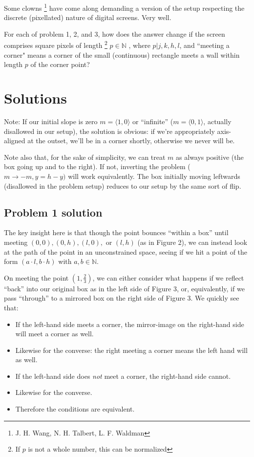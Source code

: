 \documentclass[11pt, oneside]{article} 	%
\begin{document}
Some clowns \footnote {J. H. Wang, N. H. Talbert, L. F. Waldman} have come along demanding a version of the setup respecting the discrete (pixellated) nature of digital screens.  Very well.

For each of problem 1, 2, and 3, how does the answer change if the screen comprises square pixels of length \footnote{If $p$ is not a whole number, this can be normalized} $p \in \mathbb{N}$ , where $p | j, k, h, l$, and ``meeting a corner" means a corner of the small (continuous) rectangle meets a wall within length $p$ of the corner point?



\section{Solutions}

Note: If our initial slope is zero $m = \langle 1, 0 \rangle$ or ``infinite'' ($m = \langle 0, 1 \rangle$, actually disallowed in our setup), the solution is obvious: if we're appropriately axis-aligned at the outset, we'll be in a corner shortly, otherwise we never will be.

Note also that, for the sake of simplicity, we can treat $m$ as always positive (the box going up and to the right). If not, inverting the problem ($m \rightarrow -m, y = h - y)$ will work equivalently. The box initially moving leftwards (disallowed in the problem setup) reduces to our setup by the same sort of flip.

\subsection{Problem 1 solution}

The key insight here is that though the point bounces ``within a box'' until meeting $(0,0), (0, h), (l, 0), $ or $(l, h)$ (as in Figure 2), we can instead look at the path of the point in an unconstrained space, seeing if we hit a point of the form $(a \cdot l, b \cdot h)$ with $a,b \in \mathbb{N}$.

On meeting the point $(1, \frac{2}{3})$, we can either consider what happens if we reflect ``back'' into our original box as in the left side of Figure 3, or, equivalently, if we pass ``through'' to a mirrored box on the right side of Figure 3. We quickly see that:

\begin{itemize} 
\item If the left-hand side meets a corner, the mirror-image on the right-hand side will meet a corner as well.
\item Likewise for the converse: the right meeting a corner means the left hand will as well.
\item If the left-hand side does \emph{not} meet a corner, the right-hand side cannot.
\item Likewise for the converse.
\item Therefore the conditions are equivalent.
\end{itemize}
\end{document}
